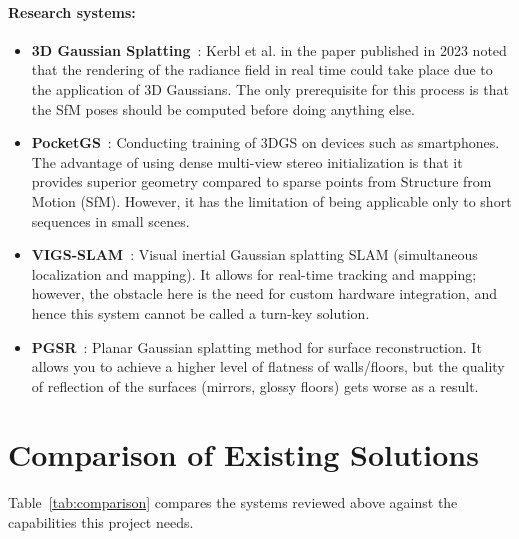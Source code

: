 \paragraph{Research systems:}
\begin{itemize}
    \item \textbf{3D Gaussian Splatting}~\cite{kerbl3dgs}: Kerbl et al. in the paper published in 2023 noted that the rendering of the radiance field in real time could take place due to the application of 3D Gaussians. The only prerequisite for this process is that the SfM poses should be computed before doing anything else.
    \item \textbf{PocketGS}~\cite{pocketgs}: Conducting training of 3DGS on devices such as smartphones. The advantage of using dense multi-view stereo initialization is that it provides superior geometry compared to sparse points from Structure from Motion (SfM). However, it has the limitation of being applicable only to short sequences in small scenes.
    \item \textbf{VIGS-SLAM}~\cite{vigsslam}: Visual inertial Gaussian splatting SLAM (simultaneous localization and mapping). It allows for real-time tracking and mapping; however, the obstacle here is the need for custom hardware integration, and hence this system cannot be called a turn-key solution.
    \item \textbf{PGSR}~\cite{pgsr}: Planar Gaussian splatting method for surface reconstruction. It allows you to achieve a higher level of flatness of walls/floors, but the quality of reflection of the surfaces (mirrors, glossy floors) gets worse as a result.
\end{itemize}

\section{Comparison of Existing Solutions}

Table~\ref{tab:comparison} compares the systems reviewed above against the capabilities this project needs.

